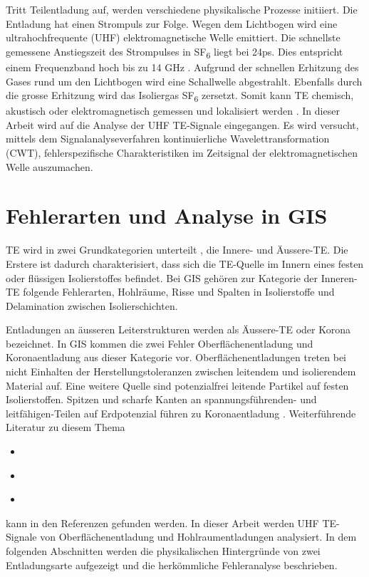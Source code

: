 \begin{refsection}
Tritt Teilentladung auf, werden verschiedene  physikalische Prozesse initiiert. 
Die Entladung hat einen Strompuls zur Folge.
Wegen dem Lichtbogen wird eine ultrahochfrequente (UHF) elektromagnetische Welle emittiert.
Die schnellste gemessene Anstiegszeit des Strompulses in SF\textsubscript{6} liegt bei 24ps.
Dies entspricht einem Frequenzband hoch bis zu 14 GHz \cite{skript:Judd24ps}. 
Aufgrund der schnellen Erhitzung des Gases rund um den Lichtbogen wird eine Schallwelle abgestrahlt. 
Ebenfalls durch die grosse Erhitzung wird das Isoliergas SF\textsubscript{6} zersetzt. 
Somit kann TE chemisch, akustisch oder elektromagnetisch gemessen und lokalisiert werden \cite{skript:StatusReviewPDMeasurement}.
In dieser Arbeit wird auf die Analyse der UHF TE-Signale eingegangen.
Es wird versucht, mittels dem Signalanalyseverfahren kontinuierliche Wavelettransformation (CWT), fehlerspezifische Charakteristiken im Zeitsignal der elektromagnetischen Welle auszumachen.

\section{Fehlerarten und Analyse in GIS}

TE wird in zwei Grundkategorien unterteilt \cite{buch:Kuchler}, die Innere- und Äussere-TE. 
Die Erstere ist dadurch charakterisiert, dass sich die TE-Quelle im Innern eines festen oder flüssigen Isolierstoffes befindet. 
Bei GIS gehören zur Kategorie der Inneren-TE folgende Fehlerarten, Hohlräume, Risse und Spalten in Isolierstoffe und Delamination zwischen Isolierschichten.
 
Entladungen an äusseren Leiterstrukturen werden als Äussere-TE oder Korona bezeichnet. 
In GIS kommen die zwei Fehler Oberflächenentladung und Koronaentladung aus dieser Kategorie vor.
Oberflächenentladungen treten bei nicht Einhalten der Herstellungstoleranzen zwischen leitendem und isolierendem Material auf.
Eine weitere Quelle sind potenzialfrei leitende Partikel auf festen Isolierstoffen.
Spitzen und scharfe Kanten an spannungsführenden- und leitfähigen-Teilen auf Erdpotenzial führen zu Koronaentladung \cite{buch:Kuchler, skript:AeussreTE, skript:InnereTE}.
Weiterführende Literatur zu diesem Thema
\begin{itemize}
	\item \citeauthor{buch:Kuchler} \cite{buch:Kuchler}
	\item \citeauthor{skript:AeussreTE} \cite{skript:AeussreTE}
	\item \citeauthor{skript:InnereTE} \cite{skript:InnereTE}  
\end{itemize}
kann in den Referenzen gefunden werden.
In dieser Arbeit werden UHF TE-Signale von Oberflächenentladung und Hohlraumentladungen analysiert. 
In dem folgenden Abschnitten werden die physikalischen Hintergründe von zwei Entladungsarte aufgezeigt und die herkömmliche Fehleranalyse beschrieben. 


\end{refsection}
